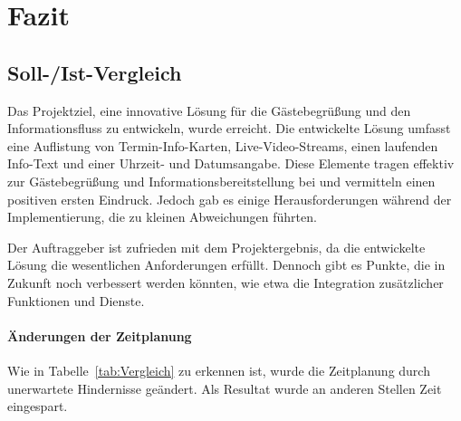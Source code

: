 \section{Fazit} 
\label{sec:Fazit}

\subsection{Soll-/Ist-Vergleich}
\label{sec:SollIstVergleich}

Das Projektziel, eine innovative Lösung für die Gästebegrüßung und den Informationsfluss zu entwickeln, wurde erreicht.
Die entwickelte Lösung umfasst eine Auflistung von Termin-Info-Karten, Live-Video-Streams, einen laufenden Info-Text und einer Uhrzeit- und Datumsangabe.
Diese Elemente tragen effektiv zur Gästebegrüßung und Informationsbereitstellung bei und vermitteln einen positiven ersten Eindruck.
Jedoch gab es einige Herausforderungen während der Implementierung, die zu kleinen Abweichungen führten.


Der Auftraggeber ist zufrieden mit dem Projektergebnis, da die entwickelte Lösung die wesentlichen Anforderungen erfüllt.
Dennoch gibt es Punkte, die in Zukunft noch verbessert werden könnten, wie etwa die Integration zusätzlicher Funktionen und Dienste.

\paragraph{Änderungen der Zeitplanung}
Wie in Tabelle~\ref{tab:Vergleich} zu erkennen ist, wurde die Zeitplanung durch unerwartete Hindernisse geändert.
Als Resultat wurde an anderen Stellen Zeit eingespart.


